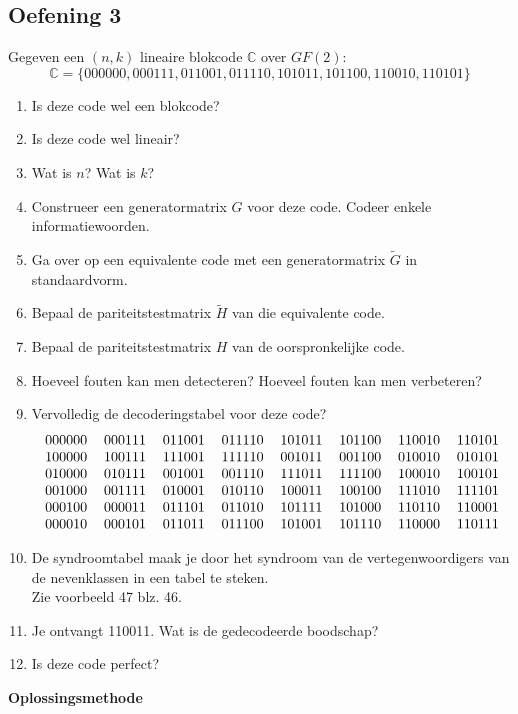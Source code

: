 \documentclass[11pt,a4paper,titlepage]{article}
\begin{document}
\subsection{Oefening 3}
	Gegeven een $(n, k)$ lineaire blokcode $\mathbb{C}$ over $GF(2)$:
		$$\mathbb{C} = \{000000, 000111, 011001, 011110, 101011, 101100, 110010, 110101\}$$
	\begin{enumerate}[label=(\alph*)]
	\item  Is deze code wel een blokcode?
	\item Is deze code wel lineair?
	\item Wat is $n$? Wat is $k$?
	\item Construeer een generatormatrix $G$ voor deze code. Codeer enkele informatiewoorden.
	\item Ga over op een equivalente code met een generatormatrix $\tilde{G}$ in standaardvorm.
	\item Bepaal de pariteitstestmatrix $\tilde{H}$ van die equivalente code.
	\item Bepaal de pariteitstestmatrix $H$ van de oorspronkelijke code.
	\item Hoeveel fouten kan men detecteren? Hoeveel fouten kan men verbeteren?
	\item Vervolledig de decoderingstabel voor deze code?
			$$\begin{tabular}{llllllll}
000000 & 000111 & 011001 & 011110 & 101011 & 101100 & 110010 & 110101 \\
100000 & 100111 & 111001 & 111110 & 001011 & 001100 & 010010 & 010101 \\
010000 & 010111 & 001001 & 001110 & 111011 & 111100 & 100010 & 100101 \\
001000 & 001111 & 010001 & 010110 & 100011 & 100100 & 111010 & 111101 \\
000100 & 000011 & 011101 & 011010 & 101111 & 101000 & 110110 & 110001 \\
000010 & 000101 & 011011 & 011100 & 101001 & 101110 & 110000 & 110111
\end{tabular}$$
	\item  De syndroomtabel maak je door het syndroom van de vertegenwoordigers van de nevenklassen in een tabel te steken.\\
		Zie voorbeeld 47 blz. 46.
	\item Je ontvangt 110011. Wat is de gedecodeerde boodschap?
	\item Is deze code perfect?
\end{enumerate}
	 \textbf{Oplossingsmethode}
\end{document}
